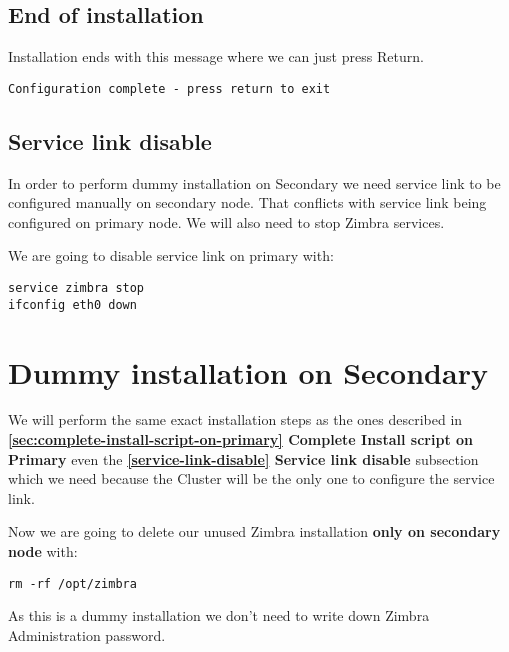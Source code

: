 \subsection {End of installation}
Installation ends with this message where we can just press Return.

\begin{verbatim}
Configuration complete - press return to exit
\end{verbatim}

\subsection {\label{service-link-disable}Service link disable}
In order to perform dummy installation on Secondary we need service link to be configured manually on secondary node. That conflicts with service link being configured on primary node. We will also need to stop Zimbra services.

We are going to disable service link on primary with:
\begin{verbatim}
service zimbra stop
ifconfig eth0 down
\end{verbatim}

\section {Dummy installation on Secondary}
We will perform the same exact installation steps as the ones described in 
\textbf{\ref{sec:complete-install-script-on-primary} Complete Install script on Primary} even the \textbf{\ref{service-link-disable} Service link disable} subsection which we need because the Cluster will be the only one to configure the service link.

Now we are going to delete our unused Zimbra installation \textbf{only on secondary node} with:
\begin{verbatim}
rm -rf /opt/zimbra
\end{verbatim}

As this is a dummy installation we don't need to write down Zimbra Administration password.